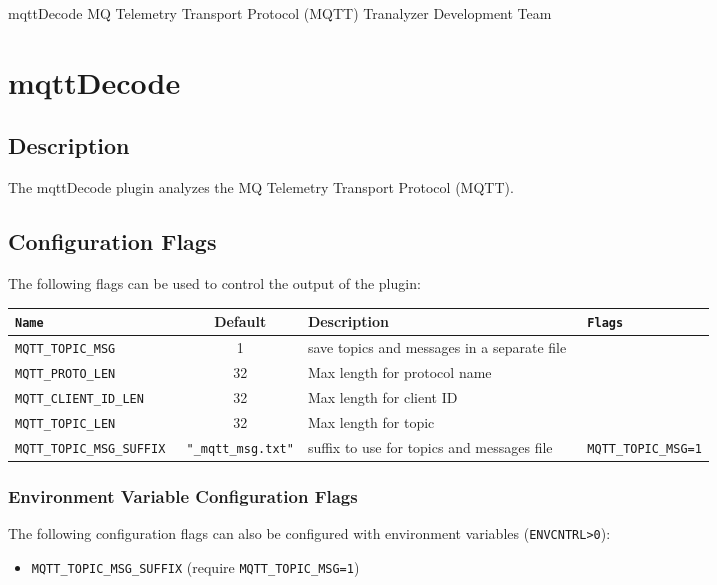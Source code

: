 \documentclass[documentation]{subfiles}
\begin{document}
\trantitle
    {mqttDecode} %
    {MQ Telemetry Transport Protocol (MQTT)} %
    {Tranalyzer Development Team} %

\section{mqttDecode}\label{s:mqttDecode}

\subsection{Description}
The mqttDecode plugin analyzes the MQ Telemetry Transport Protocol (MQTT).

\subsection{Configuration Flags}
The following flags can be used to control the output of the plugin:
\begin{longtable}{>{\tt}lcl>{\tt\small}l}
    \toprule
    {\bf Name}               & {\bf Default}                 & {\bf Description}                           & {\bf Flags}\\
    \midrule\endhead%
    MQTT\_TOPIC\_MSG         & 1                             & save topics and messages in a separate file & \\
    MQTT\_PROTO\_LEN         & 32                            & Max length for protocol name                & \\
    MQTT\_CLIENT\_ID\_LEN    & 32                            & Max length for client ID                    & \\
    MQTT\_TOPIC\_LEN         & 32                            & Max length for topic                        & \\
    MQTT\_TOPIC\_MSG\_SUFFIX & {\small\tt "\_mqtt\_msg.txt"} & suffix to use for topics and messages file  & MQTT\_TOPIC\_MSG=1\\
    \bottomrule
\end{longtable}

\subsubsection{Environment Variable Configuration Flags}
The following configuration flags can also be configured with environment variables ({\tt ENVCNTRL>0}):
\begin{itemize}
    \item {\tt MQTT\_TOPIC\_MSG\_SUFFIX} (require {\tt MQTT\_TOPIC\_MSG=1})
\end{itemize}
\end{document}
